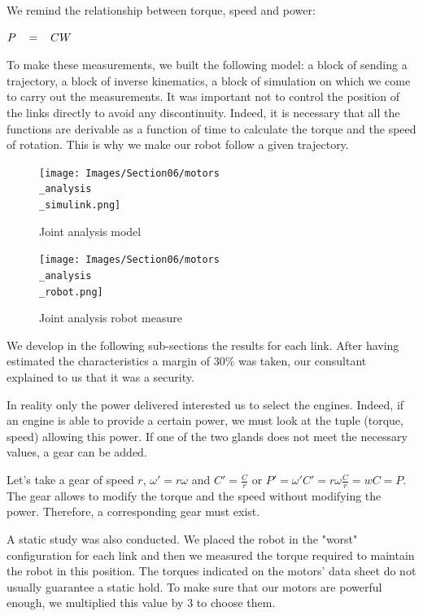 We remind the relationship between torque, speed and power: 
\begin{center}
    $P\hspace{0.3cm}=\hspace{0.3cm}CW$    
\end{center}

\bigbreak
To make these measurements, we built the following model: a block of sending a trajectory, a block of inverse kinematics, a block of simulation on which we come to carry out the measurements. It was important not to control the position of the links directly to avoid any discontinuity. Indeed, it is necessary that all the functions are derivable as a function of time to calculate the torque and the speed of rotation. This is why we make our robot follow a given trajectory.
\begin{figure}[ht]
    \centering
    \texttt{[image: Images/Section06/motors\\\_analysis\\\_simulink.png]}
    \caption{Joint analysis model}
    \label{fig:JointGlobalModel}
\end{figure}
\FloatBarrier

\begin{figure}[ht]
    \centering
    \texttt{[image: Images/Section06/motors\\\_analysis\\\_robot.png]}
    \caption{Joint analysis robot measure}
    \label{fig:JointRobotModel}
\end{figure}
\FloatBarrier


\bigbreak
We develop in the following sub-sections the results for each link. After having estimated the characteristics a margin of 30\% was taken, our consultant explained to us that it was a security. 

\bigbreak
In reality only the power delivered interested us to select the engines. Indeed, if an engine is able to provide a certain power, we must look at the tuple (torque, speed) allowing this power. If one of the two glands does not meet the necessary values, a gear can be added. 

\bigbreak
Let's take a gear of speed $r$, $\omega'= r\omega$ and $C'= \frac{C}{r}$ or $P'= \omega'C'=r\omega\frac{C}{r} = wC = P$. The gear allows to modify the torque and the speed without modifying the power. Therefore, a corresponding gear must exist.

\bigbreak
A static study was also conducted. We placed the robot in the "worst" configuration for each link and then we measured the torque required to maintain the robot in this position. The torques indicated on the motors' data sheet do not usually guarantee a static hold. To make sure that our motors are powerful enough, we multiplied this value by 3 to choose them. 


